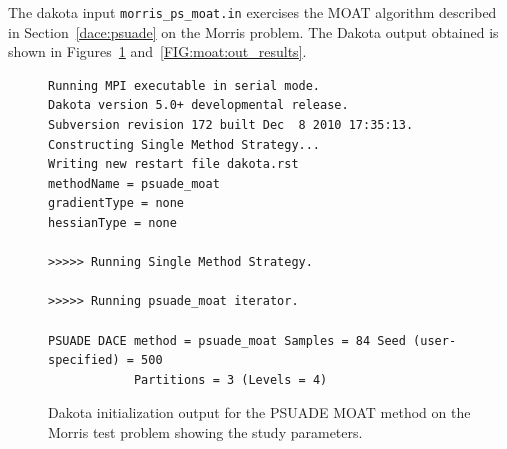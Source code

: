 The dakota input {\tt morris\_ps\_moat.in} exercises
the MOAT algorithm described in Section~\ref{dace:psuade} on the
Morris problem. The Dakota output obtained is shown in
Figures~\ref{FIG:moat:out_preamble} and~\ref{FIG:moat:out_results}.
\begin{figure}[ht!]
\centering
\begin{bigbox}
\begin{small}
\begin{verbatim}
Running MPI executable in serial mode.
Dakota version 5.0+ developmental release.
Subversion revision 172 built Dec  8 2010 17:35:13.
Constructing Single Method Strategy...
Writing new restart file dakota.rst
methodName = psuade_moat
gradientType = none
hessianType = none

>>>>> Running Single Method Strategy.

>>>>> Running psuade_moat iterator.

PSUADE DACE method = psuade_moat Samples = 84 Seed (user-specified) = 500
            Partitions = 3 (Levels = 4)
\end{verbatim}
\end{small}
\end{bigbox}
\caption[Dakota initialization output for PSUADE
MOAT.]{\label{FIG:moat:out_preamble} Dakota initialization output for
the PSUADE MOAT method on the Morris test problem showing the study
parameters.}
\end{figure}
